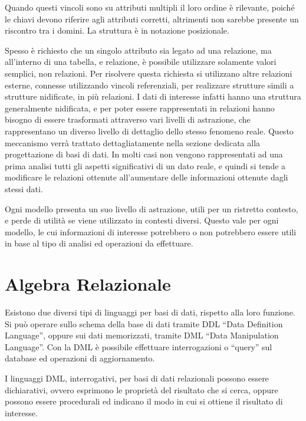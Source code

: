 \documentclass{article}
\numberwithin{equation}{subsection}
\begin{document}
Quando questi vincoli sono su attributi multipli il loro ordine è rilevante, poiché le chiavi devono riferire agli attributi corretti, altrimenti non sarebbe presente un riscontro tra i domini. La struttura è in 
notazione posizionale. 

Spesso è richiesto che un singolo attributo sia legato ad una relazione, ma all'interno di una tabella, e relazione, è possibile utilizzare solamente valori semplici, non relazioni. 
Per risolvere questa richiesta si utilizzano altre relazioni esterne, connesse utilizzando vincoli referenziali, per realizzare strutture simili a strutture nidificate, in più relazioni. I dati di interesse 
infatti hanno una struttura generalmente nidificata, e per poter essere rappresentati in relazioni hanno bisogno di essere trasformati attraverso vari livelli di astrazione, che rappresentano un diverso livello 
di dettaglio dello stesso fenomeno reale. 
Questo meccanismo verrà trattato dettagliatamente nella sezione dedicata alla progettazione di basi di dati. In molti casi non vengono rappresentati ad una prima analisi tutti gli aspetti significativi di un 
dato reale, e quindi si tende a modificare le relazioni ottenute all'aumentare delle informazioni ottenute dagli stessi dati. 

Ogni modello presenta un suo livello di astrazione, utili per un ristretto contesto, e perde di utilità se viene utilizzato in contesti diversi. Questo vale per ogni modello, le cui informazioni di interesse potrebbero 
o non potrebbero essere utili in base al tipo di analisi ed operazioni da effettuare. 


\clearpage

\section{Algebra Relazionale}

Esistono due diversi tipi di linguaggi per basi di dati, rispetto alla loro funzione. Si può operare sullo schema della base di dati tramite DDL ``Data Definition Language'', oppure sui dati 
memorizzati, tramite DML ``Data Manipulation Language''. Con la DML è possibile effettuare interrogazioni o ``query'' sul database ed operazioni di aggiornamento.

I linguaggi DML, interrogativi, per basi di dati relazionali possono essere dichiarativi, ovvero esprimono le proprietà del risultato che si cerca, oppure possono essere procedurali ed indicano il modo in cui 
si ottiene il risultato di interesse. 
\end{document}
